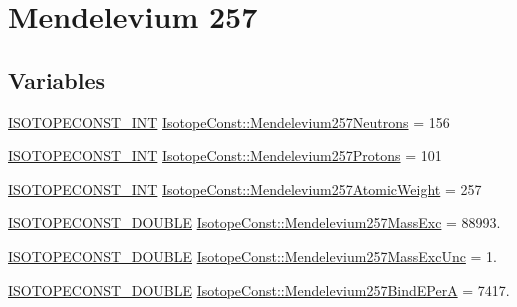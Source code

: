 \hypertarget{group___isotope_const-_mendelevium-_md257}{}\section{Mendelevium 257}
\label{group___isotope_const-_mendelevium-_md257}
\subsection*{Variables}
\begin{DoxyCompactItemize}
\item 
\mbox{\hyperlink{group___isotope_const-_macros_ga5f18360b3e99483a35c32d789e62621c}{I\+S\+O\+T\+O\+P\+E\+C\+O\+N\+S\+T\+\_\+\+I\+NT}} \mbox{\hyperlink{group___isotope_const-_mendelevium-_md257_ga8eed0ea22b9aab0facb7229ac6b6a8be}{Isotope\+Const\+::\+Mendelevium257\+Neutrons}} = 156
\item 
\mbox{\hyperlink{group___isotope_const-_macros_ga5f18360b3e99483a35c32d789e62621c}{I\+S\+O\+T\+O\+P\+E\+C\+O\+N\+S\+T\+\_\+\+I\+NT}} \mbox{\hyperlink{group___isotope_const-_mendelevium-_md257_ga81cba946aa6047bedfdddf3a11c23173}{Isotope\+Const\+::\+Mendelevium257\+Protons}} = 101
\item 
\mbox{\hyperlink{group___isotope_const-_macros_ga5f18360b3e99483a35c32d789e62621c}{I\+S\+O\+T\+O\+P\+E\+C\+O\+N\+S\+T\+\_\+\+I\+NT}} \mbox{\hyperlink{group___isotope_const-_mendelevium-_md257_gae2b09859f06ac982d1b0159d067fc026}{Isotope\+Const\+::\+Mendelevium257\+Atomic\+Weight}} = 257
\item 
\mbox{\hyperlink{group___isotope_const-_macros_ga8f45a7272ce02c0b4c65c44636ed719a}{I\+S\+O\+T\+O\+P\+E\+C\+O\+N\+S\+T\+\_\+\+D\+O\+U\+B\+LE}} \mbox{\hyperlink{group___isotope_const-_mendelevium-_md257_gae2ef466f85eb77cd00146b94f8117423}{Isotope\+Const\+::\+Mendelevium257\+Mass\+Exc}} = 88993.
\item 
\mbox{\hyperlink{group___isotope_const-_macros_ga8f45a7272ce02c0b4c65c44636ed719a}{I\+S\+O\+T\+O\+P\+E\+C\+O\+N\+S\+T\+\_\+\+D\+O\+U\+B\+LE}} \mbox{\hyperlink{group___isotope_const-_mendelevium-_md257_ga88e4a1282a2aecc1fa9b456a8abbe5fc}{Isotope\+Const\+::\+Mendelevium257\+Mass\+Exc\+Unc}} = 1.
\item 
\mbox{\hyperlink{group___isotope_const-_macros_ga8f45a7272ce02c0b4c65c44636ed719a}{I\+S\+O\+T\+O\+P\+E\+C\+O\+N\+S\+T\+\_\+\+D\+O\+U\+B\+LE}} \mbox{\hyperlink{group___isotope_const-_mendelevium-_md257_ga4ff8f444885f8676b83377238b4423c5}{Isotope\+Const\+::\+Mendelevium257\+Bind\+E\+PerA}} = 7417.

\end{DoxyCompactItemize}
